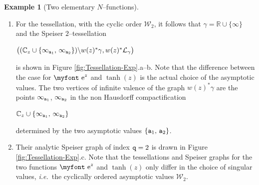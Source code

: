 \documentclass[final,3p,times]{elsarticle}
\newcommand{\CC}{\ensuremath{{\mathbb C}}}
\newcommand{\RR}{\ensuremath{{\mathbb R}}}
\newcommand{\R}{\ensuremath{{\mathcal R}}}
\newcommand{\e}{{\text{\myfont e}}}
\newcommand{\ent}[2]{{}_{#1}\hspace{-1pt}\mathscr{E}_{#2}}
\newcommand{\htan}[2]{{}_{#1}\hspace{-2pt}\mathpzc{Th}_{#2}}    %
\theoremstyle{definition}
\newtheorem{example}{Example}[section]
\begin{document}
\begin{example}[Two elementary $N$--functions]
\begin{enumerate}[label=\alph*),leftmargin=*]
\noindent
where we can immediately recognize $\R_{w(z)}$ as the union of two logarithmic towers.
In fact,
considering the cyclic order $\mathcal{W}_2=[{\tt a}_1,{\tt a}_2]$,
there are basically two choices for the decomposition:

\centerline{
$\R_{w(z)} = \mathcal{T}^\times_+ ({\tt a}_{1}, {\tt a}_{2}) 
\cup \mathcal{T}^\circ_- ({\tt a}_{1}, {\tt a}_{2})$
}

\noindent
or

\centerline{
$\R_{w(z)} = \mathcal{T}^\circ_+ ({\tt a}_{1}, {\tt a}_{2}) 
\cup \mathcal{T}^\times_- ({\tt a}_{1}, {\tt a}_{2})$.
}

\noindent 
Note that, both
$\R_{\ent{}{} (z)}$, $\R_{\htan{}{} (z)}$,
are exceptional
in the sense that there are no maximal logarithmic towers, and hence
the soul is empty.


\item For the tessellation, with the cyclic order $\mathcal{W}_2$, %
it follows that $\gamma=\RR\cup\{\infty\}$ and
the Speiser $2$--tessellation

\centerline{
$\big(
(\CC_z \cup \{ \infty_{{\tt a}_1}, \, 
\infty_{{\tt a}_2} \} ) \backslash w(z)^*\gamma, 
w(z)^*\mathcal{L}_\gamma \big)$
}

\noindent 
is shown in Figure \ref{fig:Tessellation-Exp}.a--b. 
Note that the difference between the case for 
$\e^z$ and $\tanh(z)$
is the actual choice of the asymptotic values.
The two vertices of infinite valence of 
the graph $w(z)^*\gamma$
are the points $\infty_{{\tt a}_1}$, $\infty_{{\tt a}_2}$ in the non Hausdorff compactification 

\centerline{$\CC_z \cup \{ 
\infty_{{\tt a}_1}, \, 
\infty_{{\tt a}_2}
\}$}

\noindent 
determined by the two asymptotic values 
$\{ {\tt a}_1, \, {\tt a}_2 \}$.

\item
Their analytic Speiser graph of index ${\tt q}=2$ is
drawn in Figure \ref{fig:Tessellation-Exp}.c.
Note that the tessellations and Speiser graphs for the two functions 
$\e^z$ and $\tanh(z)$
only differ in the choice of 
singular values, \emph{i.e.}\ the cyclically ordered asymptotic values $\mathcal{W}_2$.


\end{enumerate}
\end{example}
\end{document}
